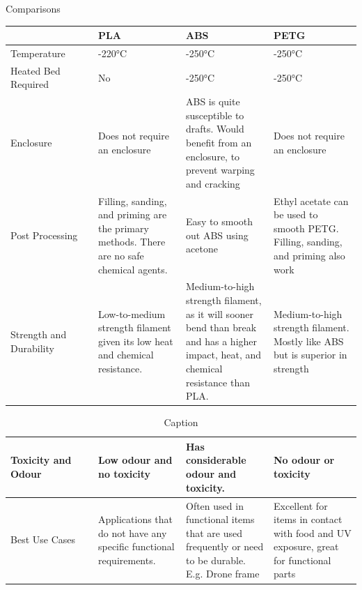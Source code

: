\documentclass[class=report,11pt,crop=false]{standalone}
\begin{document}
Comparisons
\begin{table}[h]
\centering
\begin{tabular}{|>{\raggedright\arraybackslash}p{0.25\linewidth}|>{\raggedright\arraybackslash}p{0.25\linewidth}|>{\raggedright\arraybackslash}p{0.25\linewidth}|>{\raggedright\arraybackslash}p{0.25\linewidth}|}
\hline
 & \textbf{PLA} & \textbf{ABS} & \textbf{PETG} \\ \hline
Temperature & 180-220°C & 210-250°C & 220-250°C \\ \hline
Heated Bed Required & No & 210-250°C & 220-250°C \\ \hline
Enclosure & Does not require an enclosure & ABS is quite susceptible to drafts. Would benefit from an enclosure, to prevent warping and cracking & Does not require an enclosure \\ \hline
Post Processing & Filling, sanding, and priming are the primary methods. There are no safe chemical agents. & Easy to smooth out ABS using acetone & Ethyl acetate can be used to smooth PETG. Filling, sanding, and priming also work \\ \hline
Strength and Durability & Low-to-medium strength filament given its low heat and chemical resistance. & Medium-to-high strength filament, as it will sooner bend than break and has a higher impact, heat, and chemical resistance than PLA. & Medium-to-high strength filament. Mostly like ABS but is superior in strength \\ \hline

\end{tabular}
\end{table}


\begin{table}
    \centering
    \begin{tabular}{|>{\centering\arraybackslash}p{0.25\linewidth}|>{\centering\arraybackslash}p{0.25\linewidth}|>{\centering\arraybackslash}p{0.25\linewidth}|>{\centering\arraybackslash}p{0.25\linewidth}|} \hline 
Toxicity and Odour & Low odour and no toxicity & Has considerable odour and toxicity. & No odour or toxicity \\ \hline
Best Use Cases & Applications that do not have any specific functional requirements. & Often used in functional items that are used frequently or need to be durable. E.g. Drone frame & Excellent for items in contact with food and UV exposure, great for functional parts \\ \hline
    \end{tabular}
    \caption{Caption}
    \label{tab:my_label}
\end{table}
\end{document}

